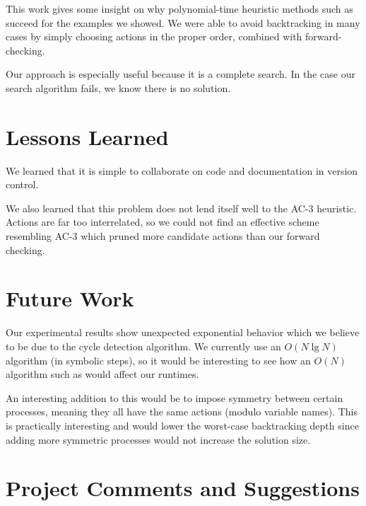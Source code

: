 This work gives some insight on why polynomial-time heuristic methods such as \cite{ipdpsEbnenasir11} succeed for the examples we showed.
We were able to avoid backtracking in many cases by simply choosing actions in the proper order, combined with forward-checking.

Our approach is especially useful because it is a complete search.
In the case our search algorithm fails, we know there is no solution.

\section{Lessons Learned}

We learned that it is simple to collaborate on code and documentation in version control.

We also learned that this problem does not lend itself well to the AC-3 heuristic.
Actions are far too interrelated, so we could not find an effective scheme resembling AC-3 which pruned more candidate actions than our forward checking.

\section{Future Work}

Our experimental results show unexpected exponential behavior which we believe to be due to the cycle detection algorithm.
We currently use an $O(N \lg N)$ algorithm (in symbolic steps), so it would be interesting to see how an $O(N)$ algorithm such as \cite{sodaGentilini03} would affect our runtimes.

An interesting addition to this would be to impose symmetry between certain processes, meaning they all have the same actions (modulo variable names).
This is practically interesting and would lower the worst-case backtracking depth since adding more symmetric processes would not increase the solution size.

\section{Project Comments and Suggestions}










